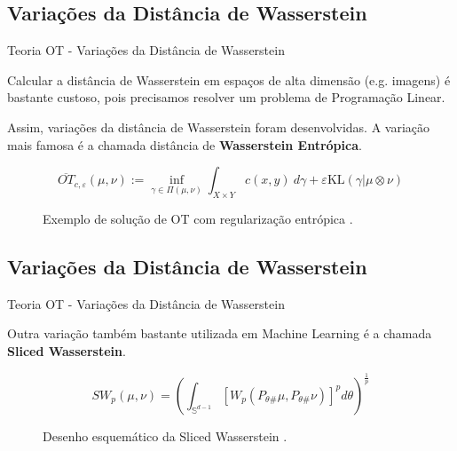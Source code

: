 \documentclass[10pt]{beamer}
\begin{document}
\subsection{Variações da Distância de Wasserstein}
\begin{frame}[fragile]{Teoria OT - Variações da Distância de Wasserstein}

	Calcular a distância de Wasserstein em espaços de alta dimensão (e.g. imagens)
	é bastante custoso, pois precisamos resolver um problema de Programação Linear.

	\vspace{3mm}
	Assim, variações da distância
	de Wasserstein foram desenvolvidas. A variação mais famosa é a chamada
	distância de \textbf{Wasserstein Entrópica}.

	\begin{displaymath}
		\overline{OT}_{c,\varepsilon}(\mu,\nu):=
		\inf_{\gamma \in \Pi(\mu,\nu)} \int_{X \times Y} c(x,y) \ d\gamma + \varepsilon \text{KL}(\gamma | \mu \otimes \nu)
	\end{displaymath}

	\begin{figure}[H]
		\centering
		\def\svgscale{0.4}
		
		\caption{
			Exemplo de solução de OT com regularização entrópica
			\citep{sales2021optimal}.}
		\label{fig:entropicot}
	\end{figure}

\end{frame}

\subsection{Variações da Distância de Wasserstein}
\begin{frame}[fragile]{Teoria OT - Variações da Distância de Wasserstein}


	Outra variação também bastante utilizada em Machine Learning
	é a chamada \textbf{Sliced Wasserstein}.

	\begin{displaymath}
		SW_p(\mu,\nu) =
		\left(
		\int_{\mathbb S^{d-1}} [W_p(P_{\theta \#}\mu,P_{\theta \#} \nu)]^p d\theta
		\right)^\frac{1}{p}
	\end{displaymath}

	\begin{figure}[H]
		\centering
		\def\svgscale{0.12}
		
		\caption{
			Desenho esquemático da Sliced Wasserstein
			\citep{sales2021optimal}.}
		\label{fig:pub}
	\end{figure}

\end{frame}
\end{document}
